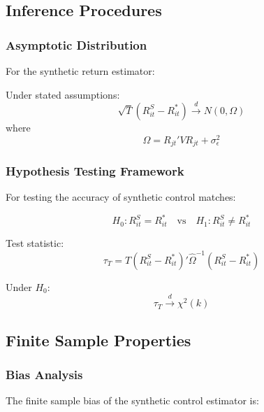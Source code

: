 \subsection{Inference Procedures}

\subsubsection{Asymptotic Distribution}

For the synthetic return estimator:

\begin{theorem}
Under stated assumptions:
\begin{equation}
    \sqrt{T}(R_{it}^S - R_{it}^*) \xrightarrow{d} N(0, \Omega)
\end{equation}
where
\begin{equation}
    \Omega = R_{jt}'VR_{jt} + \sigma_{\epsilon}^2
\end{equation}
\end{theorem}

\subsubsection{Hypothesis Testing Framework}

For testing the accuracy of synthetic control matches:

\begin{equation}
    H_0: R_{it}^S = R_{it}^* \quad \text{vs} \quad H_1: R_{it}^S \neq R_{it}^*
\end{equation}

Test statistic:
\begin{equation}
    \tau_T = T(R_{it}^S - R_{it}^*)'\hat{\Omega}^{-1}(R_{it}^S - R_{it}^*)
\end{equation}

Under $H_0$:
\begin{equation}
    \tau_T \xrightarrow{d} \chi^2(k)
\end{equation}

\subsection{Finite Sample Properties}

\subsubsection{Bias Analysis}

The finite sample bias of the synthetic control estimator is:

